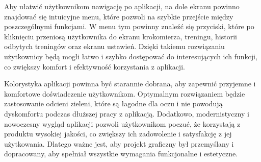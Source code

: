 Aby ułatwić użytkownikom nawigację po aplikacji, na dole ekranu powinno znajdować się intuicyjne menu, które pozwoli na szybkie przejście między poszczególnymi funkcjami. W menu tym powinny znaleźć się przyciski, które po kliknięciu przeniosą użytkownika do ekranu krokomierza, treningu, historii odbytych treningów oraz ekranu ustawień. Dzięki takiemu rozwiązaniu użytkownicy będą mogli łatwo i szybko dostępować do interesujących ich funkcji, co zwiększy komfort i efektywność korzystania z aplikacji.

Kolorystyka aplikacji powinna być starannie dobrana, aby zapewnić przyjemne i komfortowe doświadczenie użytkownikom. Optymalnym rozwiązaniem będzie zastosowanie odcieni zieleni, które są łagodne dla oczu i nie powodują dyskomfortu podczas dłuższej pracy z aplikacją. Dodatkowo, modernistyczny i nowoczesny wygląd aplikacji pozwoli użytkownikom poczuć, że korzystają z produktu wysokiej jakości, co zwiększy ich zadowolenie i satysfakcję z jej użytkowania. Dlatego ważne jest, aby projekt graficzny był przemyślany i dopracowany, aby spełniał wszystkie wymagania funkcjonalne i estetyczne.